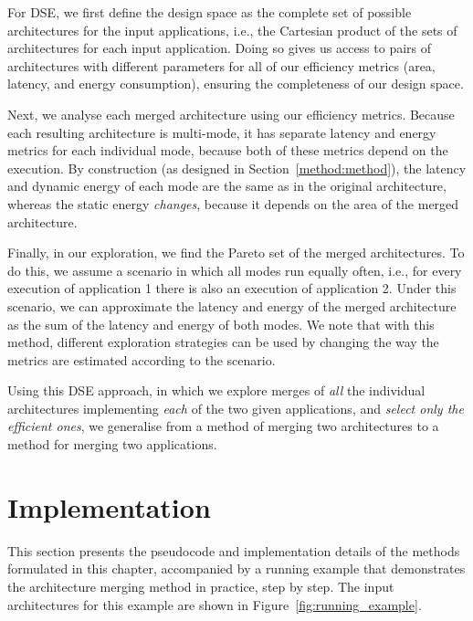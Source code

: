 For DSE, we first define the design space as the complete set of possible architectures for the input applications, i.e., the Cartesian product of the sets of architectures for each input application. Doing so gives us access to pairs of architectures with different parameters for all of our efficiency metrics (area, latency, and energy consumption), ensuring the completeness of our design space.

Next, we analyse each merged architecture using our efficiency metrics. Because each resulting architecture is multi-mode, it has separate latency and energy metrics for each individual mode, because both of these metrics depend on the execution. By construction (as designed in Section~\ref{method:method}), the latency and dynamic energy of each mode are the same as in the original architecture, whereas the static energy \textit{changes}, because it depends on the area of the merged architecture.

Finally, in our exploration, we find the Pareto set of the merged architectures. To do this, we assume a scenario in which all modes run equally often, i.e., for every execution of application 1 there is also an execution of application 2. Under this scenario, we can approximate the latency and energy of the merged architecture as the sum of the latency and energy of both modes. We note that with this method, different exploration strategies can be used by changing the way the metrics are estimated according to the scenario.

Using this DSE approach, in which we explore merges of \textit{all} the individual architectures implementing \textit{each} of the two given applications, and \textit{select only the efficient ones}, we generalise from a method of merging two architectures to a method for merging two applications.

\section{Implementation}
\label{method:implementation}
This section presents the pseudocode and implementation details of the methods formulated in this chapter, accompanied by a running example that demonstrates the architecture merging method in practice, step by step. The input architectures for this example are shown in Figure~\ref{fig:running_example}.


